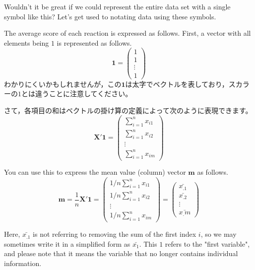 \documentclass{ltjsbook}
\begin{document}
Wouldn't it be great if we could represent the entire data set with a single symbol like this? Let's get used to notating data using these symbols.

The average score of each reaction is expressed as follows. First, a vector with all elements being $1$ is represented as follows.
\[ \bm{1}=\begin{pmatrix} 1 \\ 1 \\ \vdots \\1 \end{pmatrix} \]
わかりにくいかもしれませんが，この$\bm{1}$は太字でベクトルを表しており，スカラーの$1$とは違うことに注意してください。

さて，各項目の和はベクトルの掛け算の定義によって次のように表現できます。
\[ \bm{X}' \bm{1} = \begin{pmatrix} \sum_{i=1}^{n} x_{i1} \\ \sum_{i=1}^{n} x_{i2} \\ \vdots \\ \sum_{i=1}^{n} x_{im} \end{pmatrix} \]


You can use this to express the mean value (column) vector $\bm{m}$ as follows.
\[ \bm{m} = \frac{1}{n} \bm{X}' \bm{1} =
	\begin{pmatrix} 1/n\sum_{i=1}^{n} x_{i1} \\ 1/n\sum_{i=1}^{n} x_{i2} \\ \vdots \\ 1/n\sum_{i=1}^{n} x_{im} \end{pmatrix} =
	\begin{pmatrix}\bar{x_.1} \\ \bar{x_.2}\\ \vdots \\\bar{x_.m} \end{pmatrix} \]

Here, $\bar{x_.1}$ is not referring to removing the sum of the first index $i$, so we may sometimes write it in a simplified form as $\bar{x_1}$. This $1$ refers to the "first variable", and please note that it means the variable that no longer contains individual information.
\end{document}
